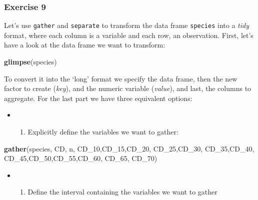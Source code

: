 \documentclass[]{article}
\newenvironment{Shaded}{\begin{snugshade}}{\end{snugshade}}
\newcommand{\KeywordTok}[1]{\textcolor[rgb]{0.13,0.29,0.53}{\textbf{#1}}}
\newcommand{\DecValTok}[1]{\textcolor[rgb]{0.00,0.00,0.81}{#1}}
\newcommand{\NormalTok}[1]{#1}
\providecommand{\tightlist}{%
  \setlength{\itemsep}{0pt}\setlength{\parskip}{0pt}}
\begin{document}
\subsubsection{Exercise 9}\label{exercise-9}

Let's use \texttt{gather} and \texttt{separate} to transform the data
frame \texttt{species} into a \emph{tidy} format, where each column is a
variable and each row, an observation. First, let's have a look at the
data frame we want to transform:

\begin{Shaded}
\begin{Highlighting}[]
\KeywordTok{glimpse}\NormalTok{(species)}
\end{Highlighting}
\end{Shaded}

To convert it into the `long' format we specify the data frame, then the
new factor to create (\emph{key}), and the numeric variable
(\emph{value}), and last, the columns to aggregate. For the last part we
have three equivalent options:

\begin{itemize}
\item
  \begin{enumerate}
  \def\labelenumi{(\Alph{enumi})}
  \tightlist
  \item
    Explicitly define the variables we want to gather:
  \end{enumerate}
\end{itemize}

\begin{Shaded}
\begin{Highlighting}[]
    \KeywordTok{gather}\NormalTok{(species, CD, n, CD_}\DecValTok{10}\NormalTok{,CD_}\DecValTok{15}\NormalTok{,CD_}\DecValTok{20}\NormalTok{, CD_}\DecValTok{25}\NormalTok{,CD_}\DecValTok{30}\NormalTok{,}
\NormalTok{                      CD_}\DecValTok{35}\NormalTok{,CD_}\DecValTok{40}\NormalTok{, CD_}\DecValTok{45}\NormalTok{,CD_}\DecValTok{50}\NormalTok{,CD_}\DecValTok{55}\NormalTok{,CD_}\DecValTok{60}\NormalTok{, CD_}\DecValTok{65}\NormalTok{, CD_}\DecValTok{70}\NormalTok{)}
\end{Highlighting}
\end{Shaded}

\begin{itemize}
\item
  \begin{enumerate}
  \def\labelenumi{(\Alph{enumi})}
  \setcounter{enumi}{1}
  \tightlist
  \item
    Define the interval containing the variables we want to gather
  \end{enumerate}
\end{itemize}
\end{document}
